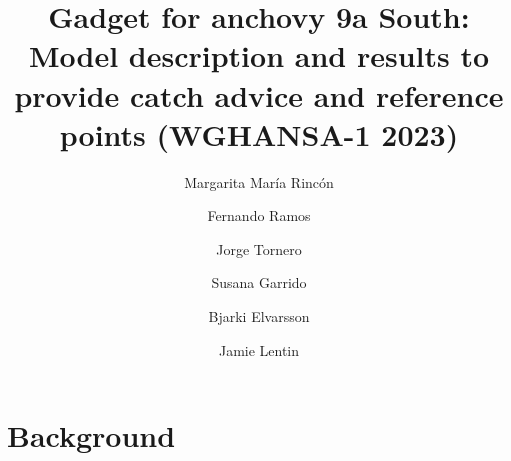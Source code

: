 \documentclass[review]{elsarticle}
\begin{document}


\begin{frontmatter}

\title{Gadget for anchovy 9a South: Model description and results to provide catch advice and reference points (WGHANSA-1 2023)}

\author[a]{Margarita Mar{\'i}a Rinc{\'o}n}
\address[a]{Instituto Español de Oceanograf{\'i}a (IEO-CSIC), Centro Oceanográfico de Cádiz, Puerto
pesquero, Muelle de Levante s/n, Apdo. 2609, 11006 Cádiz, Spain}
 

\author[a]{Fernando Ramos}

\author[a]{Jorge Tornero}  

\author[b]{Susana Garrido}

\address[b]{Instituto Portugues do Mar e da Atmosfera-IPMA, Av. Brasília, 6, 1449-006 Lisboa, Portugal}

\author[c]{Bjarki Elvarsson}

\address[c]{Marine and Freshwater Research Institute, Fornubúdum 5
220 Hafnarfjördur, Iceland}

\author[c]{Jamie Lentin}




\end{frontmatter}


\section{Background}
\end{document}
